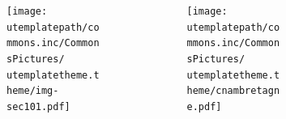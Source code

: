 \institute[\uinstituteshort]{{\uinstitute \\ \uchaire}}


\date[\uversion]{\tiny{Publication \INFODistrib ~du \\ \DTMnow}}



%
%





\begin{frame}[plain]
 					\begin{figure}
  					 \centering
  					 \begin{columns}[c]
  \begin{column}{0.4\textwidth}
  
    \begin{figure}
        \begin{centering}
  			\texttt{[image: \\utemplatepath/commons.inc/CommonsPictures/\\utemplatetheme.theme/img-sec101.pdf]}
  \end{centering}
  \end{figure}
      \end{column}
  
  \begin{column}{0.6\textwidth}
    \begin{figure}
        \begin{centering}
 		    \texttt{[image: \\utemplatepath/commons.inc/CommonsPictures/\\utemplatetheme.theme/cnambretagne.pdf]}
    \end{centering}
  \end{figure}
  \end{column}
\end{columns}
   							  
   							  \end{figure}
							
				  				\titlepage
\end{frame}


